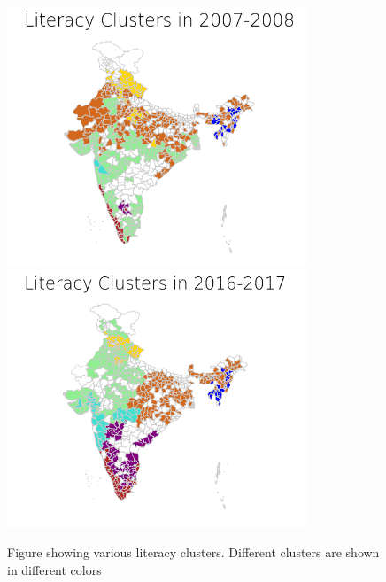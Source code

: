 \documentclass[twoside]{article}
\begin{document}
\begin{figure}[h]
    \centering
    \includegraphics[width=0.8\textwidth]{Literacy_Clusters_07_08.png}
     \includegraphics[width=0.8\textwidth]{Literacy_Cluster_16_17.png}
    \caption{Figure showing various literacy clusters. Different clusters are shown in different colors}
    \label{fig:literacy_clusters}
\end{figure}
\end{document}
